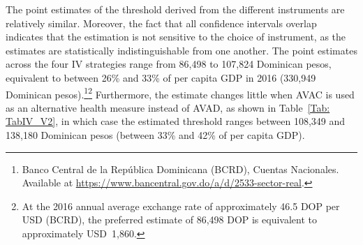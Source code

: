 \documentclass[11pt]{article}
\numberwithin{equation}{section}
\theoremstyle{remark}
\begin{document}
The point estimates of the threshold derived from the different instruments are relatively similar. Moreover, the fact that all confidence intervals overlap indicates that the estimation is not sensitive to the choice of instrument, as the estimates are statistically indistinguishable from one another. The point estimates across the four IV strategies range from 86,498 to 107,824 Dominican pesos, equivalent to between 26\% and 33\% of per capita GDP in 2016 (330,949 Dominican pesos).\footnote{Banco Central de la República Dominicana (BCRD), Cuentas Nacionales. Available at \href{https://www.bancentral.gov.do/a/d/2533-sector-real}{https://www.bancentral.gov.do/a/d/2533-sector-real}.}\footnote{At the 2016 annual average exchange rate of approximately 46.5 DOP per USD (BCRD), the preferred estimate of 86,498 DOP is equivalent to approximately USD~1,860.} Furthermore, the estimate changes little when AVAC is used as an alternative health measure instead of AVAD, as shown in Table~\ref{Tab: TabIV_V2}, in which case the estimated threshold ranges between 108,349 and 138,180 Dominican pesos (between 33\% and 42\% of per capita GDP).



\begin{table}[H]
    \caption{\label{Tab: TabIV} Cost-effectiveness threshold, alternative IV strategies}
    \centering
\end{table}
\end{document}
